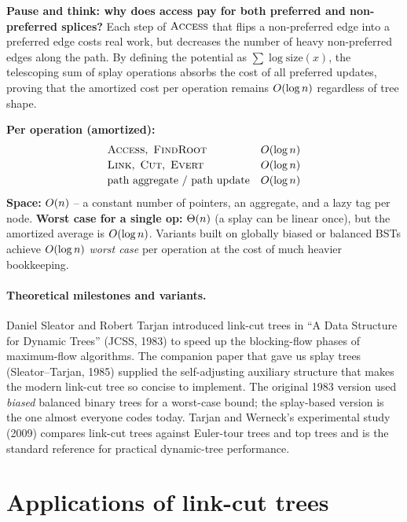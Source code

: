 \begin{recoverybox}
\textbf{Pause and think: why does access pay for both preferred and non-preferred splices?}
Each step of $\textsc{Access}$ that flips a non-preferred edge into a preferred edge costs real work, but decreases the number of heavy non-preferred edges along the path. By defining the potential as $\sum \log \mathrm{size}(x)$, the telescoping sum of splay operations absorbs the cost of all preferred updates, proving that the amortized cost per operation remains $O(\log n)$ regardless of tree shape.
\end{recoverybox}

\begin{complexitybox}
\textbf{Per operation (amortized):}
\[
\begin{array}{ll}
\textsc{Access},\ \textsc{FindRoot} & O(\log n)\\[2pt]
\textsc{Link},\ \textsc{Cut},\ \textsc{Evert} & O(\log n)\\[2pt]
\text{path aggregate / path update} & O(\log n)\\
\end{array}
\]
\textbf{Space:} $O(n)$ -- a constant number of pointers, an aggregate, and a
lazy tag per node. \textbf{Worst case for a single op:} $\Theta(n)$ (a splay can be
linear once), but the amortized average is $O(\log n)$. Variants built on
globally biased or balanced BSTs achieve $O(\log n)$ \emph{worst case} per
operation at the cost of much heavier bookkeeping.
\end{complexitybox}

\paragraph{Theoretical milestones and variants.}
Daniel Sleator and Robert Tarjan introduced link-cut trees in ``A Data Structure
for Dynamic Trees'' (JCSS, 1983) to speed up the blocking-flow phases of
maximum-flow algorithms. The companion paper that gave us splay trees
(Sleator--Tarjan, 1985) supplied the self-adjusting auxiliary structure that
makes the modern link-cut tree so concise to implement. The original 1983 version
used \emph{biased} balanced binary trees for a worst-case bound; the splay-based
version is the one almost everyone codes today. Tarjan and Werneck's experimental
study (2009) compares link-cut trees against Euler-tour trees and top trees and
is the standard reference for practical dynamic-tree performance.

\section{Applications of link-cut trees}
\label{ch22:applications}

